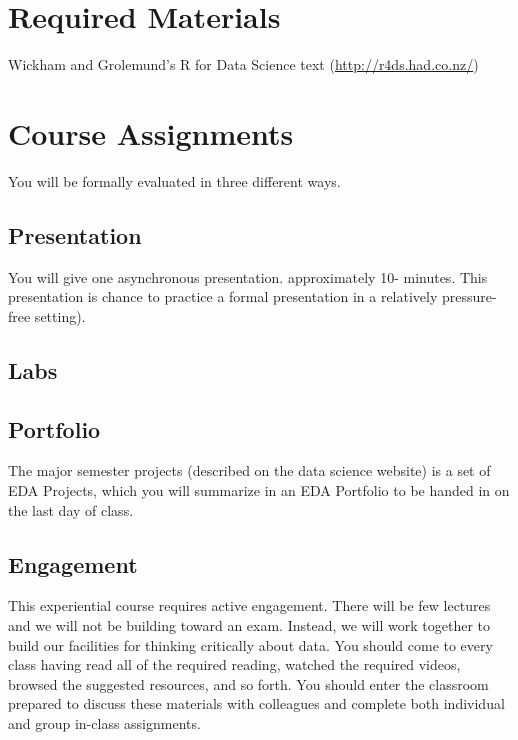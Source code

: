 \hypertarget{required-materials-2}{%
\section*{Required Materials}\label{required-materials-2}}


Wickham and Grolemund's R for Data Science text (\url{http://r4ds.had.co.nz/})

\hypertarget{course-assignments-3}{%
\section*{Course Assignments}\label{course-assignments-3}}


You will be formally evaluated in three different ways.

\hypertarget{presentation}{%
\subsection*{Presentation}\label{presentation}}


You will give one asynchronous presentation. approximately 10- minutes. This presentation is chance to practice a formal presentation in a relatively pressure-free setting).

\hypertarget{labs}{%
\subsection*{Labs}\label{labs}}


\hypertarget{portfolio}{%
\subsection*{Portfolio}\label{portfolio}}


The major semester projects (described on the data science website) is a set of EDA Projects, which you will summarize in an EDA Portfolio to be handed in on the last day of class.

\hypertarget{engagement}{%
\subsection*{Engagement}\label{engagement}}


This experiential course requires active engagement. There will be few lectures and we will not be building toward an exam. Instead, we will work together to build our facilities for thinking critically about data. You should come to every class having read all of the required reading, watched the required videos, browsed the suggested resources, and so forth. You should enter the classroom prepared to discuss these materials with colleagues and complete both individual and group in-class assignments.

